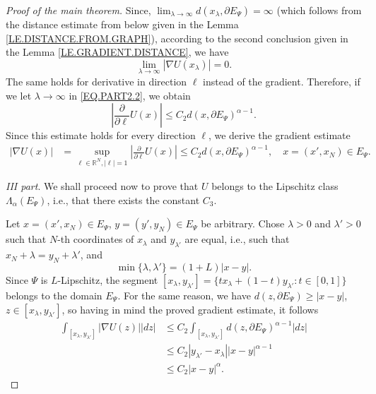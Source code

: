 \documentclass[10pt]{amsart}
\theoremstyle{definition}
\numberwithin{equation}{section}
\begin{document}
\begin{proof}[Proof of the main theorem]
Since, $\lim_{\lambda \to \infty } {d(x_\lambda,\partial E_\Psi)} = \infty$    (which follows from the distance estimate
from  below  given in  the Lemma \ref{LE.DISTANCE.FROM.GRAPH}), according         to the second  conclusion given in the
Lemma \ref{LE.GRADIENT.DISTANCE}, we have
\begin{equation*}
\lim_{\lambda\to \infty} |\nabla U(x_\lambda)| = 0.
\end{equation*}
The  same holds  for derivative  in direction  $\ell$ instead  of the gradient. Therefore, if we let $\lambda\to \infty$
in  \eqref{EQ.PART2.2}, we obtain
\begin{equation*}
\left|\frac{\partial }{\partial \ell} U (x)\right|\le C_2  d(x,\partial E_\Psi) ^{\alpha-1}.
\end{equation*}
Since this  estimate holds for every direction  $\ell$,  we derive the gradient estimate
\begin{equation*}\begin{split}
|\nabla U (x)|  & = \sup_{\ell\in \mathbb{R}^N, |\ell|=1}
\left|\frac{\partial }{\partial \ell} U(x)\right| \le C_2  d(x,\partial E_\Psi)  ^{\alpha-1},
\quad x = (x',x_N)\in E_\Psi.
\end{split}\end{equation*}

\textit{III part}.
We  shall proceed now to prove that $U$ belongs to the Lipschitz  class  $\Lambda_\alpha (E_{\Psi})$,  i.e., that  there
exists  the constant $C_3$.

Let $x = (x',x_N)\in E_\Psi$,  $y = (y',y_N)\in E_\Psi$ be arbitrary. Chose    $\lambda>0$ and  $\lambda'>0$   such that
$N$-th  coordinates of  $x_\lambda$ and $y_{\lambda'}$ are  equal, i.e.,   such that  $x_N+\lambda = y_N +\lambda'$, and
\begin{equation*}
\min\{\lambda ,\lambda' \}  =  (1+L) |x-y|.
\end{equation*}
Since  $\Psi$ is $L$-Lipschitz, the segment
$[x_\lambda, y_{\lambda'}]   =   \{t x_\lambda +    (1-t)y_{\lambda'}: t\in [0,1]\}$    belongs  to the domain $E_\Psi$.
For  the same reason,  we  have  $d(z,\partial E_\Psi)\ge  |x-y|$,  $z\in [x_\lambda, y_{\lambda'}]$,  so having in mind
the proved  gradient estimate,  it follows
\begin{equation*}\begin{split}
\int _ {[x_\lambda,y_{\lambda'}]} |\nabla  U( z )| |dz| & 
\le C_2 \int _ {[x_\lambda,y_{\lambda'}]} d(z,\partial E_\Psi)^{\alpha-1} |dz|
\\&\le C_2  | y_ {\lambda'} - x_{\lambda}|    |x-y|^{\alpha-1}
\\&\le  C_2 |x-y|^\alpha.
\end{split}\end{equation*}


\end{proof}
\end{document}
